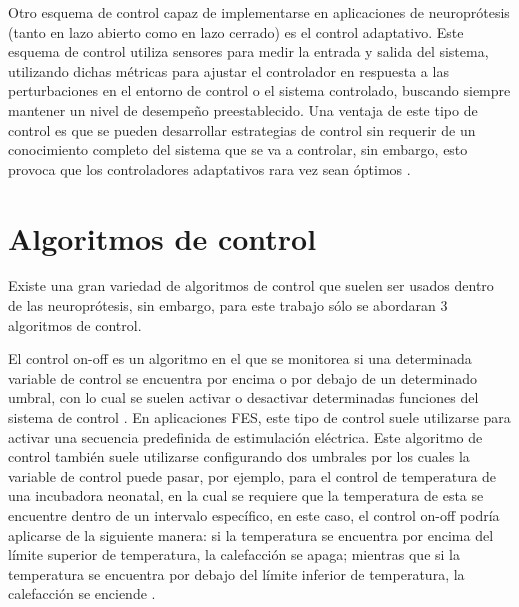 Otro esquema de control capaz de implementarse en aplicaciones de neuroprótesis (tanto en lazo abierto como en lazo cerrado) es el control adaptativo. Este esquema de control utiliza sensores para medir la entrada y salida del sistema, utilizando dichas métricas para ajustar el controlador en respuesta a las perturbaciones en el entorno de control o el sistema controlado, buscando siempre mantener un nivel de desempeño preestablecido. Una ventaja de este tipo de control es que se pueden desarrollar estrategias de control sin requerir de un conocimiento completo del sistema que se va a controlar, sin embargo, esto provoca que los controladores adaptativos rara vez sean óptimos \cite{Wright2016}.

\section{Algoritmos de control}
Existe una gran variedad de algoritmos de control que suelen ser usados dentro de las neuroprótesis, sin embargo, para este trabajo sólo se abordaran 3 algoritmos de control.

El control on-off es un algoritmo en el que se monitorea si una determinada variable de control se encuentra por encima o por debajo de un determinado umbral, con lo cual se suelen activar o desactivar determinadas funciones del sistema de control \cite{Wright2016}. En aplicaciones FES, este tipo de control suele utilizarse para activar una secuencia predefinida de estimulación eléctrica. Este algoritmo de control también suele utilizarse configurando dos umbrales por los cuales la variable de control puede pasar, por ejemplo, para el control de temperatura de una incubadora neonatal, en la cual se requiere que la temperatura de esta se encuentre dentro de un intervalo específico, en este caso, el control on-off podría aplicarse de la siguiente manera: si la temperatura se encuentra por encima del límite superior de temperatura, la calefacción se apaga; mientras que si la temperatura se encuentra por debajo del límite inferior de temperatura, la calefacción se enciende \cite{Wayne2003}.

